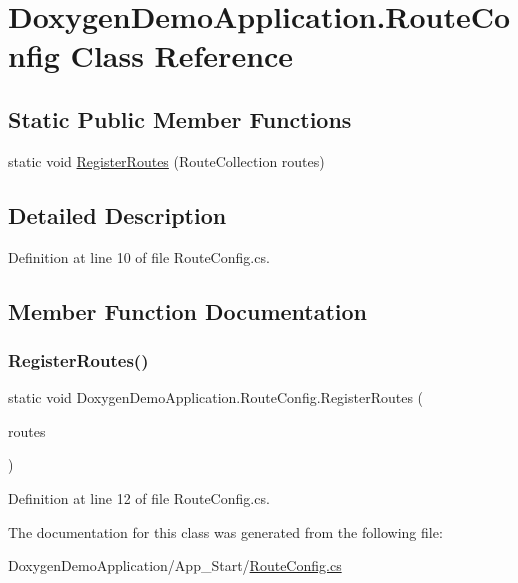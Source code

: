\hypertarget{class_doxygen_demo_application_1_1_route_config}{}\section{Doxygen\+Demo\+Application.\+Route\+Config Class Reference}
\label{class_doxygen_demo_application_1_1_route_config}
\subsection*{Static Public Member Functions}
\begin{DoxyCompactItemize}
\item 
static void \mbox{\hyperlink{class_doxygen_demo_application_1_1_route_config_ad8ce309725466085d0a5d34175a0f81b}{Register\+Routes}} (Route\+Collection routes)
\end{DoxyCompactItemize}


\subsection{Detailed Description}


Definition at line 10 of file Route\+Config.\+cs.



\subsection{Member Function Documentation}
\mbox{\label{class_doxygen_demo_application_1_1_route_config_ad8ce309725466085d0a5d34175a0f81b}} 
\subsubsection{\texorpdfstring{Register\+Routes()}{RegisterRoutes()}}
{\footnotesize\ttfamily static void Doxygen\+Demo\+Application.\+Route\+Config.\+Register\+Routes (\begin{DoxyParamCaption}\item[{Route\+Collection}]{routes }\end{DoxyParamCaption})\hspace{0.3cm}{\ttfamily [static]}}



Definition at line 12 of file Route\+Config.\+cs.



The documentation for this class was generated from the following file\+:\begin{DoxyCompactItemize}
\item 
Doxygen\+Demo\+Application/\+App\+\_\+\+Start/\mbox{\hyperlink{_route_config_8cs}{Route\+Config.\+cs}}\end{DoxyCompactItemize}
